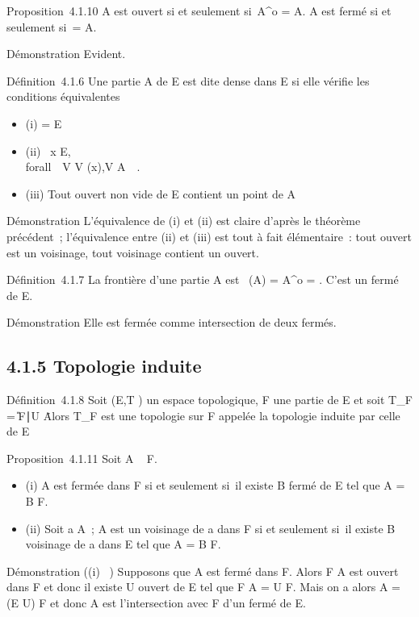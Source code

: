 \documentclass[]{article}
\begin{document}
Proposition~4.1.10 A est ouvert si et seulement si~A^o = A. A
est fermé si et seulement si~\overlineA = A.

Démonstration Evident.

Définition~4.1.6 Une partie A de E est dite dense dans E si elle vérifie
les conditions équivalentes

\begin{itemize}
\itemsep1pt\parskip0pt
\item
  (i) \overlineA = E
\item
  (ii) \forall~x \in E, \\forall~~V \in
  V (x),\quad V \bigcap A\neq~\varnothing~.
\item
  (iii) Tout ouvert non vide de E contient un point de A
\end{itemize}

Démonstration L'équivalence de (i) et (ii) est claire d'après le
théorème précédent~; l'équivalence entre (ii) et (iii) est tout à fait
élémentaire~: tout ouvert est un voisinage, tout voisinage contient un
ouvert.

Définition~4.1.7 La frontière d'une partie A est
\mathrmFr~(A) =
\overlineA \diagdown A^o =
\overlineA \bigcap\overlinecA. C'est un
fermé de E.

Démonstration Elle est fermée comme intersection de deux fermés.

\subsection{4.1.5 Topologie induite}

Définition~4.1.8 Soit (E,T ) un espace topologique, F une partie de E et
soit T_F = \U \bigcap F∣U
\inT\. Alors T_F est une topologie sur F appelée
la topologie induite par celle de E

Proposition~4.1.11 Soit A \subset~ F.

\begin{itemize}
\itemsep1pt\parskip0pt
\item
  (i) A est fermée dans F si et seulement si~il existe B fermé de E tel
  que A = B \bigcap F.
\item
  (ii) Soit a \in A~; A est un voisinage de a dans F si et seulement si~il
  existe B voisinage de a dans E tel que A = B \bigcap F.
\end{itemize}

Démonstration ((i) \rigtharrow~) Supposons que A est fermé dans F. Alors F \diagdown A est
ouvert dans F et donc il existe U ouvert de E tel que F \diagdown A = U \bigcap F.
Mais on a alors A = (E \diagdown U) \bigcap F et donc A est l'intersection avec F d'un
fermé de E.
\end{document}
